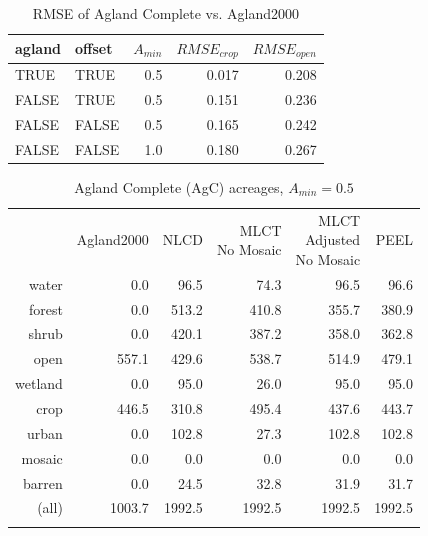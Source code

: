 \begin{table}[ht]
\begin{center}
\begin{tabular}{llrrr}
  \hline
agland & offset & $A_{min}$ & $RMSE_{crop}$ & $RMSE_{open}$ \\ 
  \hline
TRUE & TRUE & 0.5 & 0.017 & 0.208 \\ 
  FALSE & TRUE & 0.5 & 0.151 & 0.236 \\ 
  FALSE & FALSE & 0.5 & 0.165 & 0.242 \\ 
  FALSE & FALSE & 1.0 & 0.180 & 0.267 \\ 
   \hline
\end{tabular}
\caption{RMSE of Agland Complete vs. Agland2000}
\label{tab:rmse3}
\end{center}
\end{table}
\begin{table}[ht]
\begin{center}
{\small
\begin{tabular}{rrrrrr}
  \hline
 & Agland2000 & NLCD & \pbox[c][][c]{3in}{MLCT\\No Mosaic} & \pbox[c][][c]{3in}{\smallskip{}MLCT\\Adjusted\\No Mosaic} & PEEL \\ 
  \noalign{\smallskip} \hline
water & 0.0 & 96.5 & 74.3 & 96.5 & 96.6 \\ 
  forest & 0.0 & 513.2 & 410.8 & 355.7 & 380.9 \\ 
  shrub & 0.0 & 420.1 & 387.2 & 358.0 & 362.8 \\ 
  open & 557.1 & 429.6 & 538.7 & 514.9 & 479.1 \\ 
  wetland & 0.0 & 95.0 & 26.0 & 95.0 & 95.0 \\ 
  crop & 446.5 & 310.8 & 495.4 & 437.6 & 443.7 \\ 
  urban & 0.0 & 102.8 & 27.3 & 102.8 & 102.8 \\ 
  mosaic & 0.0 & 0.0 & 0.0 & 0.0 & 0.0 \\ 
  barren & 0.0 & 24.5 & 32.8 & 31.9 & 31.7 \\ 
  (all) & 1003.7 & 1992.5 & 1992.5 & 1992.5 & 1992.5 \\ 
   \noalign{\smallskip} \hline
\end{tabular}
}
\caption{Agland Complete (AgC) acreages, $A_{min}=0.5$}
\label{tab:areas3}
\end{center}
\end{table}
 

